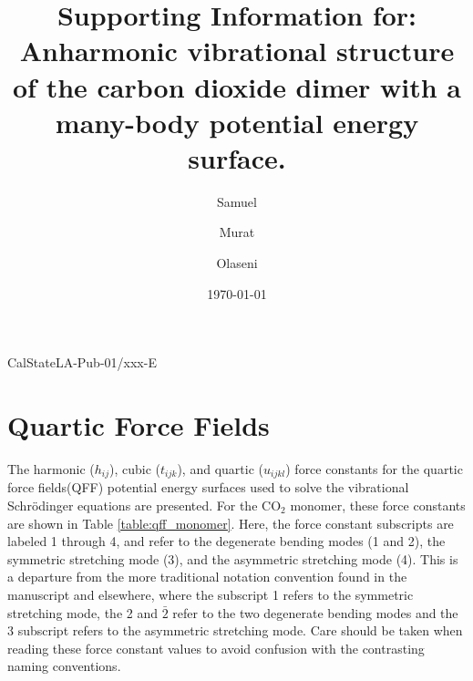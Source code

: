 \documentclass[aip,jcp,showpacs,superscriptaddress,groupedaddress]{revtex4-1}  %
\begin{document}
\newcommand*{\citen}[1]{%
  \begingroup
    \romannumeral-`\x %
    \setcitestyle{numbers}%
    \cite{#1}%
  \endgroup   
}
\newcommand\Tstrut{\rule{0pt}{2.6ex}}         %
\newcommand\Bstrut{\rule[-1.5ex]{0pt}{0pt}}   %

\hspace{5.2in} \mbox{CalStateLA-Pub-01/xxx-E}

\title{Supporting Information for: Anharmonic vibrational structure of the carbon dioxide dimer with a many-body potential energy surface.}

\author{Samuel }
\author{Murat }
\author{Olaseni }

\date{\today}


\pacs{}

\maketitle

\section[S1]{\label{sec:qff}Quartic Force Fields}
The harmonic ($h_{ij}$), cubic ($t_{ijk}$), and quartic ($u_{ijkl}$) force constants for the quartic force fields(QFF) potential energy surfaces used to solve the vibrational Schr{\"o}dinger equations are presented. For the CO$_2$ monomer, these force constants are shown in Table \ref{table:qff_monomer}. Here, the force constant subscripts are labeled 1 through 4, and refer to the degenerate bending modes (1 and 2), the symmetric stretching mode (3), and the asymmetric stretching mode (4). This is a departure from the more traditional notation convention found in the manuscript and elsewhere\cite{}, where the subscript 1 refers to the symmetric stretching mode, the 2 and $\bar{2}$ refer to the two degenerate bending modes and the 3 subscript refers to the asymmetric stretching mode. Care should be taken when reading these force constant values to avoid confusion with the contrasting naming conventions.
\end{document}
